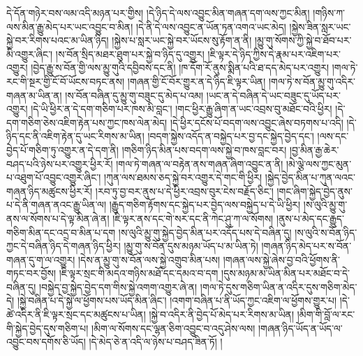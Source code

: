 དེ་དོན་གཉེར་བས་ལམ་འདི་མཉན་པར་གྱིས། །དེ་ཉིད་དེ་ལས་འབྱུང་མིན་གཞན་དག་ལས་ཀྱང་མིན། །གཉིས་ཀ་ལས་མིན་རྒྱུ་མེད་པར་ཡང་འབྱུང་བ་མིན། །དེ་ནི་དེ་ལས་འབྱུང་ན་ཡོན་ཏན་འགའ་ཡང་མེད། །སྐྱེས་ཟིན་སླར་ཡང་སྐྱེ་བར་རིགས་པའང་མ་ཡིན་ཉིད། །སྐྱེས་པ་སླར་ཡང་སྐྱེ་བར་ཡོངས་སུ་རྟོག་ན་ནི། །མྱུ་གུ་སོགས་ཀྱི་སྐྱེ་བ་ཐོབ་པར་མི་འགྱུར་ཞིང་། །ས་བོན་སྲིད་མཐར་ཐུག་པར་སྐྱེ་བ་ཉིད་དུ་འགྱུར། །ཇི་ལྟར་དེ་ཉིད་ཀྱིས་དེ་རྣམ་པར་འཇིག་པར་འགྱུར། །བྱེད་རྒྱུ་ས་བོན་གྱི་ལས་མྱུ་གུའི་དབྱིབས་དང་ནི། །ཁ་དོག་རོ་ནུས་སྨིན་པའི་ཐ་དད་མེད་པར་འགྱུར། །གལ་ཏེ་རང་གི་སྔར་གྱི་ངོ་བོ་ཡོངས་བཏང་ནས། །གཞན་གྱི་ངོ་བོར་གྱུར་ན་དེ་ཉིད་ཇི་ལྟར་ཡིན། །གལ་ཏེ་ས་བོན་མྱུ་གུ་འདིར་གཞན་མ་ཡིན་ན། །ས་བོན་བཞིན་དུ་མྱུ་གུ་བཟུང་དུ་མེད་པ་འམ། །ཡང་ན་དེ་བཞིན་དེ་ཡང་བཟུང་དུ་ཡོད་པར་འགྱུར། །དེ་ཡི་ཕྱིར་ན་དེ་དག་གཅིག་པར་ཁས་མི་བླང་། །གང་ཕྱིར་རྒྱུ་ཞིག་ན་ཡང་འབྲས་བུ་མཐོང་བའི་ཕྱིར། །དེ་དག་གཅིག་ཅེས་འཇིག་རྟེན་པས་ཀྱང་ཁས་ལེན་མེད། །དེ་ཕྱིར་དངོས་པོ་བདག་ལས་འབྱུང་ཞེས་བཏགས་པ་འདི། །དེ་ཉིད་དང་ནི་འཇིག་རྟེན་དུ་ཡང་རིགས་མ་ཡིན། །བདག་སྐྱེས་འདོད་ན་བསྐྱེད་པར་བྱ་དང་སྐྱེད་བྱེད་དང་། །ལས་དང་བྱེད་པོ་གཅིག་ཏུ་འགྱུར་ན་དེ་དག་ནི། །གཅིག་ཉིད་མིན་པས་བདག་ལས་སྐྱེ་བ་ཁས་བླང་བར། །བྱ་མིན་རྒྱ་ཆེར་བཤད་པའི་ཉེས་པར་འགྱུར་ཕྱིར་རོ། །གལ་ཏེ་གཞན་ལ་བརྟེན་ནས་གཞན་ཞིག་འབྱུང་ན་ནི། །མེ་ལྕེ་ལས་ཀྱང་མུན་པ་འཐུག་པོ་འབྱུང་འགྱུར་ཞིང་། །ཀུན་ལས་ཐམས་ཅད་སྐྱེ་བར་འགྱུར་དེ་གང་གི་ཕྱིར། །སྐྱེད་བྱེད་མིན་པ་ཀུན་ལའང་གཞན་ཉིད་མཚུངས་ཕྱིར་རོ། །རབ་ཏུ་བྱ་བར་ནུས་པ་དེ་ཕྱིར་འབྲས་བུར་ངེས་བརྗོད་ཅིང་། །གང་ཞིག་སྐྱེད་བྱེད་ནུས་པ་དེ་ནི་གཞན་ནའང་རྒྱུ་ཡིན་ལ། །རྒྱུད་གཅིག་རྟོགས་དང་སྐྱེད་པར་བྱེད་ལས་བསྐྱེད་པ་དེ་ཡི་ཕྱིར། །ས་ལུའི་མྱུ་གུ་ནས་ལ་སོགས་པ་དེ་ལྟ་མིན་ཞེ་ན། །ཇི་ལྟར་ནས་དང་གེ་སར་དང་ནི་ཀེང་ཤུ་ཀ་ལ་སོགས། །ནུས་པ་མེད་དང་རྒྱུད་གཅིག་མིན་དང་འདྲ་བ་མིན་པ་དག །ས་ལུའི་མྱུ་གུ་སྐྱེད་བྱེད་མིན་པར་འདོད་པས་དེ་བཞིན་དུ། །ས་ལུའི་ས་བོན་ཉིད་ཀྱང་དེ་བཞིན་ཉིད་དེ་གཞན་ཉིད་ཕྱིར། །མྱུ་གུ་ས་བོན་དུས་མཉམ་ཡོད་པ་མ་ཡིན་ཏེ། །གཞན་ཉིད་མེད་པར་ས་བོན་གཞན་དུ་ག་ལ་འགྱུར། །དེས་ན་མྱུ་གུ་ས་བོན་ལས་སྐྱེ་འགྲུབ་མིན་པས། །གཞན་ལས་སྐྱེ་ཞེས་བྱ་བའི་ཕྱོགས་ནི་གཏང་བར་བྱོས། །ཇི་ལྟར་སྲང་གི་མདའ་གཉིས་མཐོ་དང་དམའ་བ་དག །དུས་མཉམ་མ་ཡིན་མིན་པར་མཐོང་བ་དེ་བཞིན་དུ། །བསྐྱེད་བྱ་སྐྱེད་བྱེད་དག་གིས་སྐྱེ་འགག་འགྱུར་ཞེ་ན། །གལ་ཏེ་དུས་གཅིག་ཡིན་ན་འདིར་དུས་གཅིག་མེད་དེ། །སྐྱེ་བཞིན་པ་དེ་སྐྱེ་ལ་ཕྱོགས་པས་ཡོད་མིན་ཞིང་། །འགག་བཞིན་པ་ནི་ཡོད་ཀྱང་འཇིག་ལ་ཕྱོགས་གྱུར་པ། །དེ་ཚེ་འདིར་ནི་ཇི་ལྟར་སྲང་དང་མཚུངས་པ་ཡིན། །སྐྱེ་བ་འདིར་ནི་བྱེད་པོ་མེད་པར་རིགས་མ་ཡིན། །མིག་གི་བློ་ལ་རང་གི་སྐྱེད་བྱེད་དུས་གཅིག་པ། །མིག་ལ་སོགས་དང་ལྷན་ཅིག་འབྱུང་བ་འདུ་ཤེས་ལས། །གཞན་ཉིད་ཡོད་ན་ཡོད་ལ་འབྱུང་བས་དགོས་ཅི་ཡོད། །དེ་མེད་ཅེ་ན་འདི་ལ་ཉེས་པ་བཤད་ཟིན་ཏོ། །
